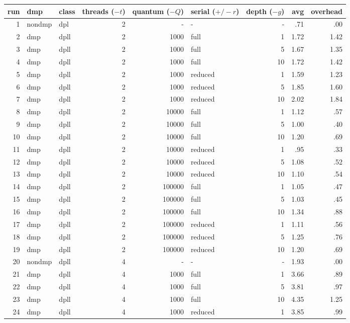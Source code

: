 \begin{center}
\begin{small}
\begin{longtable}{rllrrlrrr}
\hline
run & dmp & class & threads ($-t$) & quantum ($-Q$) & serial ($+/-r$) & depth ($-g$) & avg & overhead\\
\hline
 1 & nondmp & dpl & 2 & - & - & - & .71 & .00\\
 2 & dmp & dpll & 2 & 1000 & full & 1 & 1.72 & 1.42\\
 3 & dmp & dpll & 2 & 1000 & full & 5 & 1.67 & 1.35\\
 4 & dmp & dpll & 2 & 1000 & full & 10 & 1.72 & 1.42\\
 5 & dmp & dpll & 2 & 1000 & reduced & 1 & 1.59 & 1.23\\
 6 & dmp & dpll & 2 & 1000 & reduced & 5 & 1.85 & 1.60\\
 7 & dmp & dpll & 2 & 1000 & reduced & 10 & 2.02 & 1.84\\
 8 & dmp & dpll & 2 & 10000 & full & 1 & 1.12 & .57\\
 9 & dmp & dpll & 2 & 10000 & full & 5 & 1.00 & .40\\
10 & dmp & dpll & 2 & 10000 & full & 10 & 1.20 & .69\\
11 & dmp & dpll & 2 & 10000 & reduced & 1 & .95 & .33\\
12 & dmp & dpll & 2 & 10000 & reduced & 5 & 1.08 & .52\\
13 & dmp & dpll & 2 & 10000 & reduced & 10 & 1.10 & .54\\
14 & dmp & dpll & 2 & 100000 & full & 1 & 1.05 & .47\\
15 & dmp & dpll & 2 & 100000 & full & 5 & 1.03 & .45\\
16 & dmp & dpll & 2 & 100000 & full & 10 & 1.34 & .88\\
17 & dmp & dpll & 2 & 100000 & reduced & 1 & 1.11 & .56\\
18 & dmp & dpll & 2 & 100000 & reduced & 5 & 1.25 & .76\\
19 & dmp & dpll & 2 & 100000 & reduced & 10 & 1.20 & .69\\
\hline
20 & nondmp & dpll & 4 & - & - & - & 1.93 & .00\\
21 & dmp & dpll & 4 & 1000 & full & 1 & 3.66 & .89\\
22 & dmp & dpll & 4 & 1000 & full & 5 & 3.81 & .97\\
23 & dmp & dpll & 4 & 1000 & full & 10 & 4.35 & 1.25\\
24 & dmp & dpll & 4 & 1000 & reduced & 1 & 3.85 & .99\\

\end{longtable}
\end{small}
\end{center}
